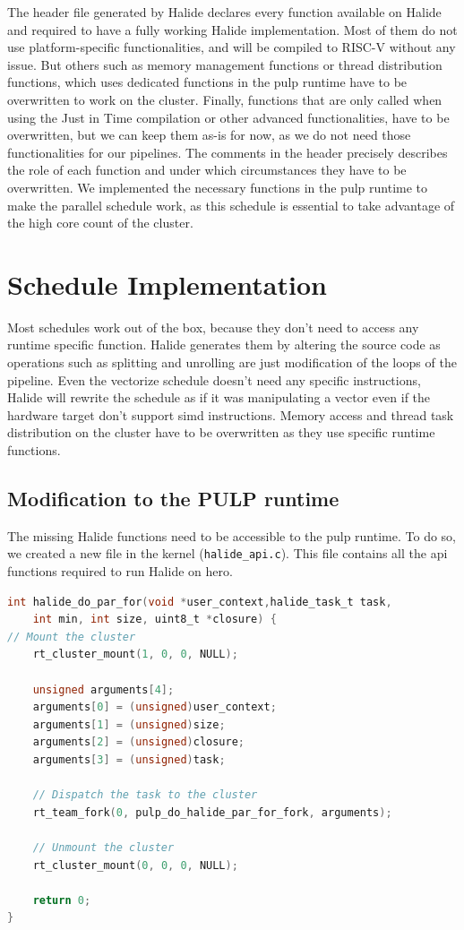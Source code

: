     The header file generated by Halide declares every function available on Halide and required to have a fully working Halide implementation. 
    Most of them do not use platform-specific functionalities, and will be compiled to RISC-V without any issue.
    But others such as memory management functions or thread distribution functions, which uses dedicated functions in the \gls{pulp} runtime have to be overwritten to work on the cluster.
    Finally, functions that are only called when using the Just in Time compilation or other advanced functionalities, have to be overwritten, but we can keep them as-is for now, as we do not need those functionalities for our pipelines. 
    The comments in the header precisely describes the role of each function and under which circumstances they have to be overwritten.
    We implemented the necessary functions in the \gls{pulp} runtime to make the parallel schedule work, as this schedule is essential to take advantage of the high core count of the cluster.
 
\section{Schedule Implementation }
    Most schedules work out of the box, because they don't need to access any runtime specific function.
    Halide generates them by altering the source code as operations such as splitting and unrolling are just modification of the loops of the pipeline. 
    Even the vectorize schedule doesn't need any specific instructions, Halide will rewrite the schedule as if it was manipulating a vector even if the hardware target don't support \gls{simd} instructions. 
    Memory access and thread task distribution on the cluster have to be overwritten as they use specific runtime functions.

    \subsection{Modification to the PULP runtime}

    The missing Halide functions need to be accessible to the \gls{pulp} runtime. To do so, we created a new file in the kernel (\texttt{halide\_api.c}). 
    This file contains all the \gls{api} functions required to run Halide on \gls{hero}.

\begin{lstlisting}[language=C,caption={The \texttt{halide\_do\_par\_for} function.},label={lst:halidedoparfor},captionpos=b]
int halide_do_par_for(void *user_context,halide_task_t task,
    int min, int size, uint8_t *closure) {
// Mount the cluster
    rt_cluster_mount(1, 0, 0, NULL);

    unsigned arguments[4];
    arguments[0] = (unsigned)user_context;
    arguments[1] = (unsigned)size;
    arguments[2] = (unsigned)closure;
    arguments[3] = (unsigned)task;

    // Dispatch the task to the cluster
    rt_team_fork(0, pulp_do_halide_par_for_fork, arguments);

    // Unmount the cluster
    rt_cluster_mount(0, 0, 0, NULL);

    return 0;
}
\end{lstlisting}



